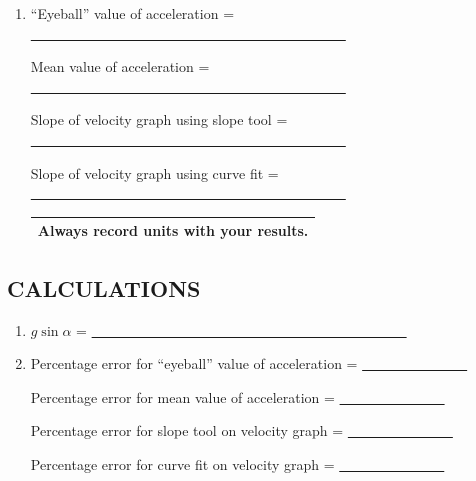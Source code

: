 \begin{enumerate}[label=\arabic*.]

\setcounter{enumi}{2}
\item ``Eyeball'' value of acceleration = \ul{~~~~~~~~~~~~~~~~~~~~~~~~~~~~~~~~~~~~~~~~~~~~~}

Mean value of acceleration = \ul{~~~~~~~~~~~~~~~~~~~~~~~~~~~~~~~~~~~~~~~~~~~~~}

Slope of velocity graph using slope tool = \ul{~~~~~~~~~~~~~~~~~~~~~~~~~~~~~~~~~~~~~~~~~~~~~}

Slope of velocity graph using curve fit = \ul{~~~~~~~~~~~~~~~~~~~~~~~~~~~~~~~~~~~~~~~~~~~~~}

\begin{center}
\begin{tabular}{|p{14cm}|}
\hline\tstrut
Always record units with your results.  \bstrut\\
\hline
\end{tabular}
\end{center}

\end{enumerate}

\subsection*{CALCULATIONS}

\begin{enumerate}[start=2]

\item \(g\sin\alpha\) = \ul{~~~~~~~~~~~~~~~~~~~~~~~~~~~~~~~~~~~~~~~~~~~~~}

\item Percentage error for ``eyeball'' value of acceleration = \ul{~~~~~~~~~~~~~~~}

Percentage error for mean value of acceleration = \ul{~~~~~~~~~~~~~~~}

Percentage error for slope tool on velocity graph = \ul{~~~~~~~~~~~~~~~}

Percentage error for curve fit on velocity graph = \ul{~~~~~~~~~~~~~~~}

\end{enumerate}


